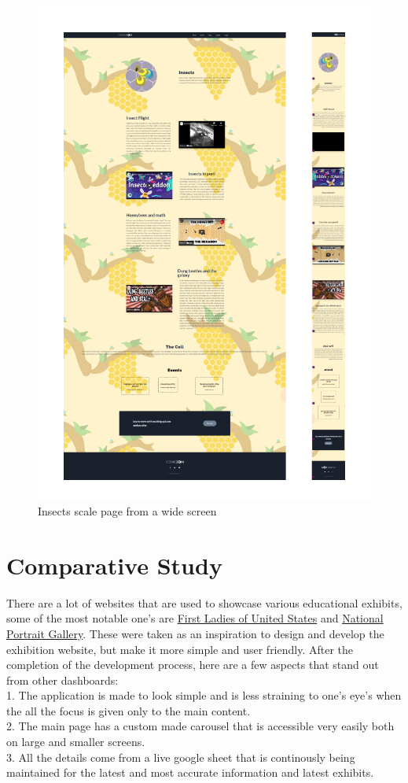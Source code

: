 \begin{figure}[h]
	\begin{center}
		\includegraphics[scale=0.1]{Figures/mob-web.jpg}
		\caption{Insects scale page from a wide screen}
		\label{fig:rb}
	\end{center}
\end{figure}


\section{Comparative Study}
There are a lot of websites that are used to showcase various educational exhibits, some of the most notable one's are \href{https://firstladies.si.edu/gallery}{First Ladies of United States} and \href{https://www.npg.si.edu/}{National Portrait Gallery}. These were taken as an inspiration to design and develop the exhibition website, but make it more simple and user friendly. After the completion of the development process, here are a few
aspects that stand out from other dashboards:
\\
1. The application is made to look simple and is less straining to one's eye's when the all the focus is given only to the main content.
\\
2. The main page has a custom made carousel that is accessible very easily both on large and smaller screens.
\\
3. All the details come from a live google sheet that is continously being maintained for the latest and most accurate information and latest exhibits.


